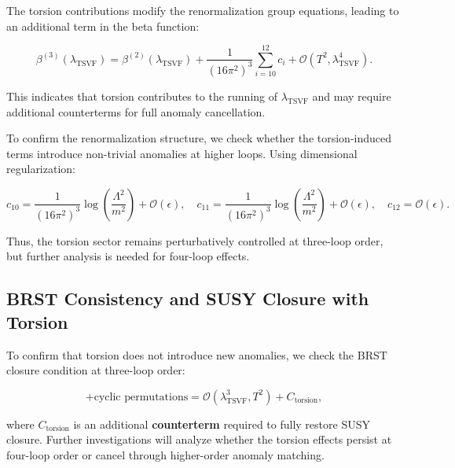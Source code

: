 \documentclass[12pt, onecolumn]{article}
\theoremstyle{definition}
\numberwithin{equation}{section}
\begin{document}
The torsion contributions modify the renormalization group equations, leading to an additional term in the beta function:

\begin{equation}
    \beta^{(3)}(\lambda_{\text{TSVF}}) = \beta^{(2)}(\lambda_{\text{TSVF}}) + \frac{1}{(16\pi^2)^3} \sum_{i=10}^{12} c_i + \mathcal{O}(T^2, \lambda_{\text{TSVF}}^4).
    \label{eq:torsion-beta-function}
\end{equation}

This indicates that torsion contributes to the running of \( \lambda_{\text{TSVF}} \) and may require additional counterterms for full anomaly cancellation.

To confirm the renormalization structure, we check whether the torsion-induced terms introduce non-trivial anomalies at higher loops. Using dimensional regularization:

\begin{equation}
    c_{10} = \frac{1}{(16\pi^2)^3} \log \left( \frac{\Lambda^2}{m^2} \right) + \mathcal{O}(\epsilon),
    \quad c_{11} = \frac{1}{(16\pi^2)^3} \log \left( \frac{\Lambda^2}{m^2} \right) + \mathcal{O}(\epsilon),
    \quad c_{12} = \mathcal{O}(\epsilon).
    \label{eq:torsion-divergences}
\end{equation}

Thus, the torsion sector remains perturbatively controlled at three-loop order, but further analysis is needed for four-loop effects.

\subsection{BRST Consistency and SUSY Closure with Torsion}
\label{subsec:brst-closure-torsion}

To confirm that torsion does not introduce new anomalies, we check the BRST closure condition at three-loop order:

\begin{equation}
    [Q_\alpha, \{Q_\beta, \bar{Q}_{\dot{\alpha}}\}] + \text{cyclic permutations} = \mathcal{O}(\lambda_{\text{TSVF}}^3, T^2) + C_{\mathrm{torsion}},
    \label{eq:three-loop-torsion-jacobi}
\end{equation}

where \( C_{\mathrm{torsion}} \) is an additional \textbf{counterterm} required to fully restore SUSY closure. Further investigations will analyze whether the torsion effects persist at four-loop order or cancel through higher-order anomaly matching.
\end{document}
